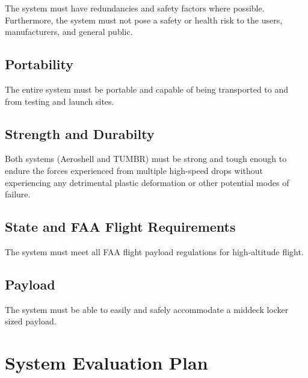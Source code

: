 \indent\indent The system must have redundancies and safety factors where possible. Furthermore, the system must not pose a safety or health risk to the users, manufacturers, and general public. 


\subsection{Portability}

\indent\indent The entire system must be portable and capable of being transported to and from testing and launch sites.


\subsection{Strength and Durabilty}

\indent\indent Both systems (Aeroshell and TUMBR) must be strong and tough enough to endure the forces experienced from multiple high-speed drops without experiencing any detrimental plastic deformation or other potential modes of failure. 


\subsection{State and FAA Flight Requirements}

\indent\indent The system must meet all FAA flight payload regulations for high-altitude flight. 


\subsection{Payload}

\indent\indent The system must be able to easily and safely accommodate a middeck locker sized payload.


\section{System Evaluation Plan}

